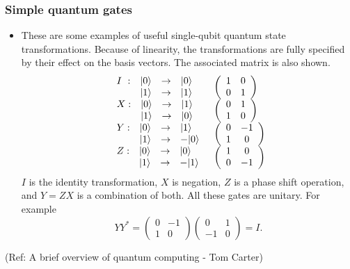  \begin{frame}[fragile]\frametitle{Simple quantum gates}

\begin{itemize}
	\item  These are some examples of useful single-qubit quantum state transformations.
Because of linearity, the transformations are fully specified by
their effect on the basis vectors. 
The associated matrix is also shown.
$$\begin{array}{ll}
\begin{array}{lrcl}
I\ :& |{0}\rangle & \to & |{0}\rangle\\
  & |{1}\rangle & \to & |{1}\rangle\\
\end{array} &
\left(\begin{array}{cc}1 & 0\\ 0 & 1\end{array}\right)\\
\begin{array}{lrcl}
X:& |{0}\rangle & \to & |{1}\rangle\\
  & |{1}\rangle & \to & |{0}\rangle\\
\end{array} &
\left(\begin{array}{cc}0 & 1\\ 1 & 0\end{array}\right)\\
\begin{array}{lrcl}
Y:& |{0}\rangle & \to & |{1}\rangle\\
  & |{1}\rangle & \to &-|{0}\rangle\\
\end{array} &
\left(\begin{array}{cc}0 & -1\\ 1 & 0\end{array}\right)\\
\begin{array}{lrcl}
Z:& |{0}\rangle & \to & |{0}\rangle\\
  & |{1}\rangle & \to & -|{1}\rangle\\
\end{array} &
\left(\begin{array}{cc}1 & 0\\ 0 & -1\end{array}\right)\\
\end{array}$$ 
$I$ is the identity transformation, $X$ is negation, $Z$ is
a phase shift operation, and $Y = ZX$ is a combination of both.  
All these gates are unitary.  For example
$$YY^* = \left(\begin{array}{cc}0 & -1\\ 1 & 0\end{array}\right) 
	 \left(\begin{array}{cc}0 & 1\\ -1 & 0\end{array}\right) = I.$$


\end{itemize}

\tiny{(Ref: A brief overview of quantum computing - Tom Carter)}

\end{frame}

